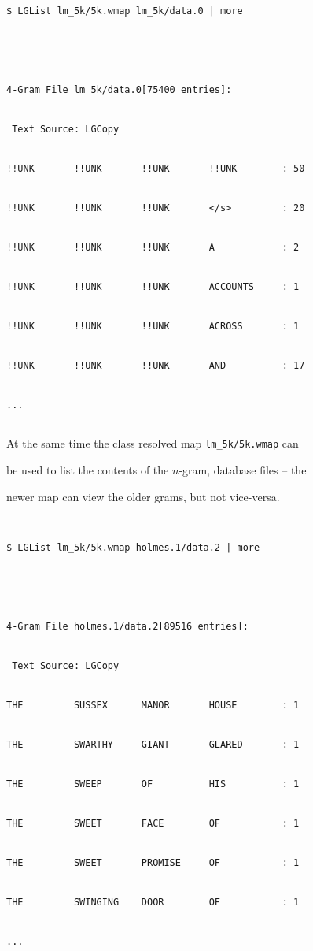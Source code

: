 \begin{verbatim}


$ LGList lm_5k/5k.wmap lm_5k/data.0 | more





4-Gram File lm_5k/data.0[75400 entries]:


 Text Source: LGCopy


!!UNK       !!UNK       !!UNK       !!UNK        : 50


!!UNK       !!UNK       !!UNK       </s>         : 20


!!UNK       !!UNK       !!UNK       A            : 2


!!UNK       !!UNK       !!UNK       ACCOUNTS     : 1


!!UNK       !!UNK       !!UNK       ACROSS       : 1


!!UNK       !!UNK       !!UNK       AND          : 17


...


\end{verbatim} %





At the same time the class resolved map \texttt{lm\_5k/5k.wmap} can


be used to list the contents of the $n$-gram, database files -- the


newer map can view the older grams, but not vice-versa.


\begin{verbatim}


$ LGList lm_5k/5k.wmap holmes.1/data.2 | more





4-Gram File holmes.1/data.2[89516 entries]:


 Text Source: LGCopy


THE         SUSSEX      MANOR       HOUSE        : 1


THE         SWARTHY     GIANT       GLARED       : 1


THE         SWEEP       OF          HIS          : 1


THE         SWEET       FACE        OF           : 1


THE         SWEET       PROMISE     OF           : 1


THE         SWINGING    DOOR        OF           : 1


...


\end{verbatim} %


